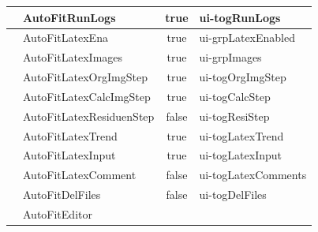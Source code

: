 \documentclass[11pt]{article} %
\begin{document}
\begin{longtable}{|l|l|c|l|}
 & AutoFitRunLogs & true & ui-togRunLogs \\ \hline
 & AutoFitLatexEna & true & ui-grpLatexEnabled \\ \hline
 & AutoFitLatexImages & true & ui-grpImages \\ \hline
 & AutoFitLatexOrgImgStep & true & ui-togOrgImgStep \\ \hline
 & AutoFitLatexCalcImgStep & true & ui-togCalcStep \\ \hline
 & AutoFitLatexResiduenStep & false & ui-togResiStep \\ \hline
 & AutoFitLatexTrend & true & ui-togLatexTrend \\ \hline
 & AutoFitLatexInput & true & ui-togLatexInput \\ \hline
 & AutoFitLatexComment & false & ui-togLatexComments \\ \hline
 & AutoFitDelFiles & false & ui-togDelFiles \\ \hline
 & AutoFitEditor & &  \\ \hline

\end{longtable}
\end{document}
